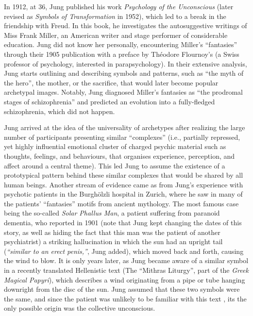 \documentclass[
]{book}
\begin{document}
In 1912, at 36, Jung published his work \emph{Psychology of the Unconscious} (later revised as \emph{Symbols of Transformation} in 1952), which led to a break in the friendship with Freud. In this book, he investigates the autosuggestive writings of Miss Frank Miller, an American writer and stage performer of considerable education. Jung did not know her personally, encountering Miller's ``fantasies'' through their 1905 publication with a preface by Théodore Flournoy's (a Swiss professor of psychology, interested in parapsychology). In their extensive analysis, Jung starts outlining and describing symbols and patterns, such as ``the myth of the hero'', the mother, or the sacrifice, that would later become popular archetypal images. Notably, Jung diagnosed Miller's fantasies as ``the prodromal stages of schizophrenia'' and predicted an evolution into a fully-fledged schizophrenia, which did not happen.

Jung arrived at the idea of the universality of archetypes after realizing the large number of participants presenting similar ``complexes'' (i.e., partially repressed, yet highly influential emotional cluster of charged psychic material such as thoughts, feelings, and behaviours, that organises experience, perception, and affect around a central theme). This led Jung to assume the existence of a prototypical pattern behind these similar complexes that would be shared by all human beings. Another stream of evidence came as from Jung's experience with psychotic patients in the Burghölzli hospital in Zurich, where he saw in many of the patients' ``fantasies'' motifs from ancient mythology. The most famous case being the so-called \emph{Solar Phallus Man}, a patient suffering from paranoid dementia, who reported in 1901 (note that Jung kept changing the dates of this story, as well as hiding the fact that this man was the patient of another psychiatrist) a striking hallucination in which the sun had an upright tail (\emph{``similar to an erect penis,''}, Jung added), which moved back and forth, causing the wind to blow. It is only years later, as Jung became aware of a similar symbol in a recently translated Hellenistic text (The ``Mithras Liturgy'', part of the \emph{Greek Magical Papyri}), which describes a wind originating from a pipe or tube hanging downright from the disc of the sun. Jung assumed that these two symbols were the same, and since the patient was unlikely to be familiar with this text \citep[or so claimed Jung; see][ for a detailed description of Jung's falsifications and lies]{noll1997jung}, its the only possible origin was the collective unconscious.
\end{document}
